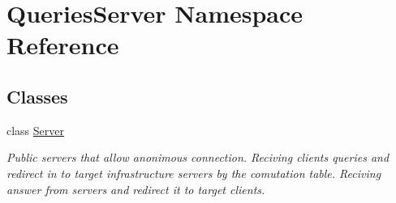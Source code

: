 \hypertarget{namespace_queries_server}{}\section{Queries\+Server Namespace Reference}
\label{namespace_queries_server}
\subsection*{Classes}
\begin{DoxyCompactItemize}
\item 
class \mbox{\hyperlink{class_queries_server_1_1_server}{Server}}
\begin{DoxyCompactList}\small\item\em Public servers that allow anonimous connection. Reciving clients\textquotesingle{} queries and redirect in to target infrastructure servers by the comutation table. Reciving answer from servers and redirect it to target clients. \end{DoxyCompactList}\end{DoxyCompactItemize}
